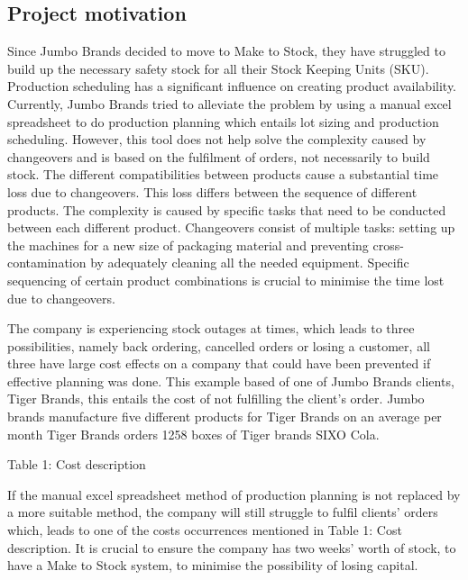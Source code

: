 \documentclass[a4paper,11pt,fleqn]{report}
\begin{document}
        \subsection{Project motivation}
            Since Jumbo Brands decided to move to Make to Stock, they have struggled to build up the necessary safety stock for all their Stock Keeping Units (SKU). Production scheduling has a significant influence on creating product availability. Currently, Jumbo Brands tried to alleviate the problem by using a manual excel spreadsheet to do production planning which entails lot sizing and production scheduling. However, this tool does not help solve the complexity caused by changeovers and is based on the fulfilment of orders, not necessarily to build stock. The different compatibilities between products cause a substantial time loss due to changeovers. This loss differs between the sequence of different products. The complexity is caused by specific tasks that need to be conducted between each different product. Changeovers consist of multiple tasks: setting up the machines for a new size of packaging material and preventing cross-contamination by adequately cleaning all the needed equipment. Specific sequencing of certain product combinations is crucial to minimise the time lost due to changeovers.
            
            The company is experiencing stock outages at times, which leads to three possibilities, namely back ordering, cancelled orders or losing a customer, all three have large cost effects on a company that could have been prevented if effective planning was done. This example based of one of Jumbo Brands clients, Tiger Brands, this entails the cost of not fulfilling the client’s order. Jumbo brands manufacture five different products for Tiger Brands on an average per month Tiger Brands orders 1258 boxes of Tiger brands SIXO Cola.
            
            Table 1: Cost description
            
            If the manual excel spreadsheet method of production planning is not replaced by a more suitable method, the company will still struggle to fulfil clients’ orders which, leads to one of the costs occurrences mentioned in Table 1: Cost description. It is crucial to ensure the company has two weeks’ worth of stock, to have a Make to Stock system, to minimise the possibility of losing capital.
\end{document}
